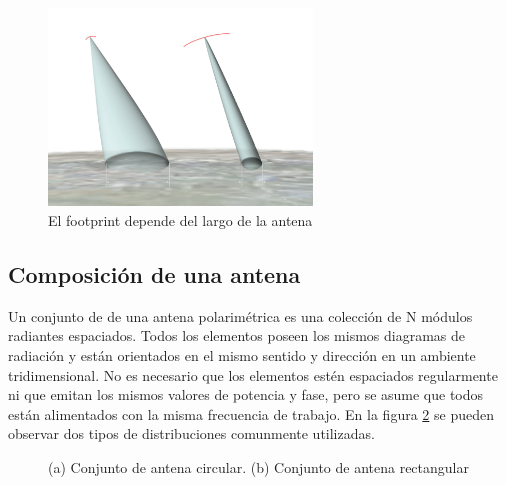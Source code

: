 \begin{figure}[H]
 \centering
 \includegraphics[width=7cm]{gfx/footprint.png}
 \caption{El footprint depende del largo de la antena}
 \label{fig:footprint}
\end{figure}

\subsection{Composición de una antena}

Un conjunto de de una antena polarimétrica es una colección de N módulos radiantes espaciados. Todos los elementos poseen los
mismos diagramas de radiación y están orientados en el mismo sentido y dirección en un ambiente tridimensional. No es
necesario que los elementos estén espaciados regularmente ni que emitan los mismos valores de potencia y fase, pero se asume
que todos están alimentados con la misma frecuencia de trabajo. En la figura \ref{fig:phasedArrayAntenna} se pueden observar
dos tipos de distribuciones comunmente utilizadas.

\begin{figure}[H]
	\centering
	\caption{ (a) Conjunto de antena circular. (b) Conjunto de antena rectangular}
	\label{fig:phasedArrayAntenna}
\end{figure}

